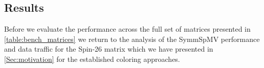  

\subsection{Results}
Before we evaluate the performance across the full set of matrices presented in \cref{table:bench_matrices} we return to the analysis of the \acrshort{SymmSpMV} performance and data traffic for the Spin-26 matrix  which we have presented in \cref{Sec:motivation} for the established coloring approaches. 
%
